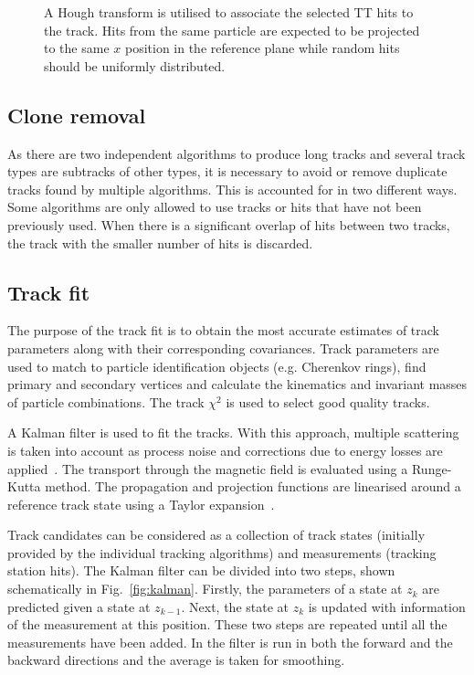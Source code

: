 \begin{figure}[!htb]
  \centering
  
  \caption{A Hough transform is utilised to associate the selected TT hits to the \velo track. Hits from the same particle are expected to be projected to the same $x$ position in the reference plane while random hits should be uniformly distributed.}
  \label{fig:velott-tracking}
\end{figure}

\subsection{Clone removal}
\label{sec:track:clone}

As there are two independent algorithms to produce long tracks and several track types are subtracks of other types, it is necessary to avoid or remove duplicate tracks found by multiple algorithms. This is accounted for in two different ways. Some algorithms are only allowed to use tracks or hits that have not been previously used. When there is a significant overlap of hits between two tracks, the track with the smaller number of hits is discarded. 

\subsection{Track fit}
\label{sec:track:fit}

The purpose of the track fit  is to obtain the most accurate estimates of track parameters along with their corresponding covariances. Track parameters are used to match to particle identification objects (e.g. Cherenkov rings), find primary and secondary vertices and calculate the kinematics and invariant masses of particle combinations. The track $\chi^{2}$ is used to select good quality tracks. 

A Kalman filter is used to fit the tracks. With this approach, multiple scattering is taken into account as process noise and corrections due to energy losses are applied~\cite{kalman}. The transport through the magnetic field is evaluated using a Runge-Kutta method. The propagation and projection functions are linearised around a reference track state using a Taylor expansion~\cite{jeroen}.

Track candidates can be considered as a collection of track states (initially provided by the individual tracking algorithms) and measurements (tracking station hits). The Kalman filter can be divided into two steps, shown schematically in Fig.~\ref{fig:kalman}. Firstly, the parameters of a state at $z_{k}$ are predicted given a state at $z_{k-1}$. Next, the state at $z_{k}$ is updated with information of the measurement at this position. These two steps are repeated until all the measurements have been added. In \lhcb the filter is run in both the forward and the backward directions and the average is taken for smoothing.

